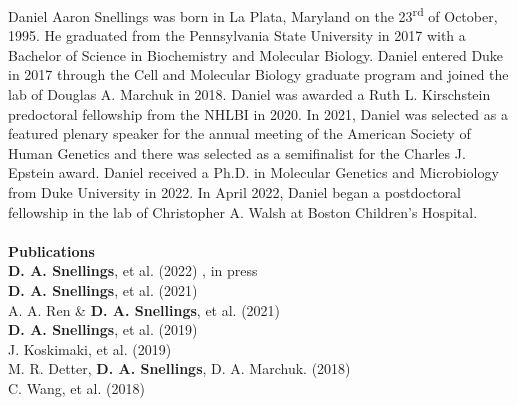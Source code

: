 \biography

Daniel Aaron Snellings was born in La Plata, Maryland on the 23\textsuperscript{rd} of October, 1995. He graduated from the Pennsylvania State University in 2017 with a Bachelor of Science in Biochemistry and Molecular Biology. Daniel entered Duke in 2017 through the Cell and Molecular Biology graduate program and joined the lab of Douglas A. Marchuk in 2018. Daniel was awarded a Ruth L. Kirschstein predoctoral fellowship from the NHLBI in 2020. In 2021, Daniel was selected as a featured plenary speaker for the annual meeting of the American Society of Human Genetics and there was selected as a semifinalist for the Charles J. Epstein award. Daniel received a Ph.D. in Molecular Genetics and Microbiology from Duke University in 2022. In April 2022, Daniel began a postdoctoral fellowship in the lab of Christopher A. Walsh at Boston Children's Hospital.
\\\\
{\Large \textbf{Publications}} \\
\textbf{D. A. Snellings}, et al. (2022) , in press\\
\textbf{D. A. Snellings}, et al. (2021) \\ \nocite{snellings2021}
A. A. Ren \& \textbf{D. A. Snellings}, et al. (2021) \\ \nocite{ren2021}
\textbf{D. A. Snellings}, et al. (2019) \\ \nocite{snellings2019}
J. Koskimaki, et al. (2019) \\ \nocite{koskimaki2019}
M. R. Detter, \textbf{D. A. Snellings}, D. A. Marchuk. (2018) \\ \nocite{detter2018}
C. Wang, et al. (2018)  \nocite{wang2018}